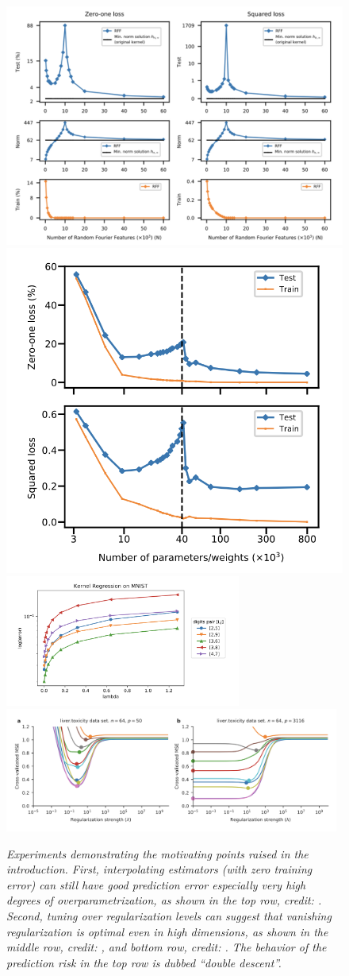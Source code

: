 \documentclass{article}
\begin{document}
\begin{figure}[p]
\centering
\hspace{-20pt}
\includegraphics[height=0.39\textwidth]{belkin1.png}
\includegraphics[height=0.39\textwidth]{belkin2.png} 
\bigskip\medskip \\
\includegraphics[width=0.69\textwidth]{liang.png} 
\bigskip \\
\includegraphics[width=0.98\textwidth]{kobak.png}
\caption{\it Experiments demonstrating the motivating points raised in the
  introduction. First, interpolating estimators (with zero training error) can
  still have good prediction error especially very high degrees of
  overparametrization, as shown in the top row, credit:
  \citet{belkin2019reconciling}. Second, tuning over regularization levels can    
  suggest that vanishing regularization is optimal even in high dimensions, as
  shown in the middle row, credit: \citet{liang2020just}, and bottom row,
  credit: \citet{kobak2020optimal}. The behavior of the prediction risk in the
  top row is dubbed ``double descent''.}    
\label{fig:experiments}
\end{figure}
\end{document}
